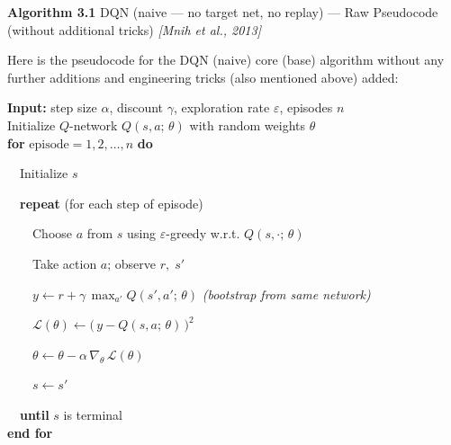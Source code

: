 \documentclass[11pt]{article}
\begin{document}
    \label{pseudo-3-1}

    \begin{pseudobox}

\textbf{Algorithm 3.1} DQN (naive --- no target net, no replay) --- Raw
Pseudocode (without additional tricks) \emph{{[}Mnih et al., 2013{]}}

\tcbline

Here is the pseudocode for the DQN (naive) core (base) algorithm without
any further additions and engineering tricks (also mentioned above)
added:

\textbf{Input:} step size \(\alpha\), discount \(\gamma\), exploration
rate \(\varepsilon\), episodes \(n\)\\
Initialize \(Q\)-network \(Q(s, a;\, \theta)\) with random weights
\(\theta\)\\
\textbf{for} \(\text{episode} = 1, 2, \ldots, n\) \textbf{do}\\
\strut ~~Initialize \(s\)\\
\strut ~~\textbf{repeat} (for each step of episode)\\
\strut ~~~~Choose \(a\) from \(s\) using \(\varepsilon\)-greedy w.r.t.
\(Q(s, \cdot;\, \theta)\)\\
\strut ~~~~Take action \(a\); observe \(r,\; s'\)\\
\strut ~~~~\(y \leftarrow r + \gamma\, \max_{a'} Q(s', a';\, \theta)\)
\emph{(bootstrap from same network)}\\
\strut ~~~~\(\mathcal{L}(\theta) \leftarrow \bigl(\, y - Q(s, a;\, \theta) \,\bigr)^{2}\)\\
\strut ~~~~\(\theta \leftarrow \theta - \alpha\, \nabla_{\theta}\, \mathcal{L}(\theta)\)\\
\strut ~~~~\(s \leftarrow s'\)\\
\strut ~~\textbf{until} \(s\) is terminal\\
\textbf{end for}

\end{pseudobox}
\end{document}
